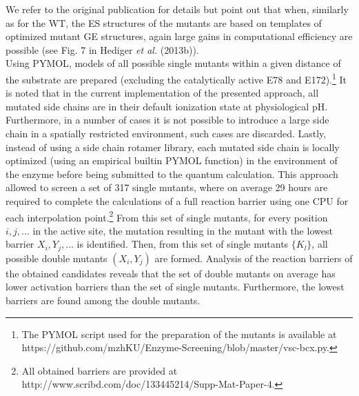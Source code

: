 We refer to the original publication for details\cite{hediger2013computational} but point out that when, similarly as for the WT, the ES structures of the mutants are based on templates of optimized mutant GE structures, again large gains in computational efficiency are possible (see Fig. 7 in Hediger \textit{et al.} (2013b)).\\
Using PYMOL\cite{PyMOLu}, models of all possible single mutants within a given distance of the substrate are prepared (excluding the catalytically active E78 and E172).\footnote{The PYMOL script used for the preparation of the mutants is available at https://github.com/mzhKU/Enzyme-Screening/blob/master/vsc-bcx.py.}
It is noted that in the current implementation of the presented approach, all mutated side chains are in their default ionization state at physiological pH.
Furthermore, in a number of cases it is not possible to introduce a large side chain in a spatially restricted environment, such cases are discarded.
Lastly, instead of using a side chain rotamer library, each mutated side chain is locally optimized (using an empirical builtin PYMOL function) in the environment of the enzyme before being submitted to the quantum calculation.
This approach allowed to screen a set of 317 single mutants, where on average 29 hours are required to complete the calculations of a full reaction barrier using one CPU for each interpolation point.\footnote{All obtained barriers are provided at http://www.scribd.com/doc/133445214/Supp-Mat-Paper-4.}
From this set of single mutants, for every position $i, j, ...$ in the active site, the mutation resulting in the mutant with the lowest barrier $X_i, Y_j, ...$ is identified.
Then, from this set of single mutants $\{K_l\}$, all possible double mutants $(X_i, Y_j)$ are formed.
Analysis of the reaction barriers of the obtained candidates reveals that the set of double mutants on average has lower activation barriers than the set of single mutants.
Furthermore, the lowest barriers are found among the double mutants.
